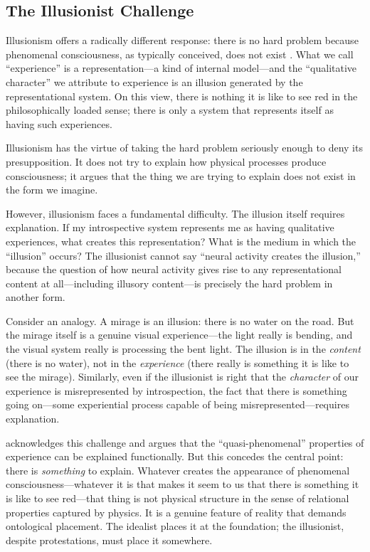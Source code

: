 \documentclass[11pt,a4paper]{article}
\theoremstyle{definition}
\theoremstyle{plain}
\theoremstyle{remark}
\begin{document}
\subsection{The Illusionist Challenge}\label{sec:illusionism}

Illusionism offers a radically different response: there is no hard problem because phenomenal consciousness, as typically conceived, does not exist \citep{Frankish2016}. What we call ``experience'' is a representation---a kind of internal model---and the ``qualitative character'' we attribute to experience is an illusion generated by the representational system. On this view, there is nothing it is like to see red in the philosophically loaded sense; there is only a system that represents itself as having such experiences.

Illusionism has the virtue of taking the hard problem seriously enough to deny its presupposition. It does not try to explain how physical processes produce consciousness; it argues that the thing we are trying to explain does not exist in the form we imagine.

However, illusionism faces a fundamental difficulty. The illusion itself requires explanation. If my introspective system represents me as having qualitative experiences, what creates this representation? What is the medium in which the ``illusion'' occurs? The illusionist cannot say ``neural activity creates the illusion,'' because the question of how neural activity gives rise to any representational content at all---including illusory content---is precisely the hard problem in another form.

Consider an analogy. A mirage is an illusion: there is no water on the road. But the mirage itself is a genuine visual experience---the light really is bending, and the visual system really is processing the bent light. The illusion is in the \textit{content} (there is no water), not in the \textit{experience} (there really is something it is like to see the mirage). Similarly, even if the illusionist is right that the \textit{character} of our experience is misrepresented by introspection, the fact that there is something going on---some experiential process capable of being misrepresented---requires explanation.

\citet{Frankish2016} acknowledges this challenge and argues that the ``quasi-phenomenal'' properties of experience can be explained functionally. But this concedes the central point: there is \textit{something} to explain. Whatever creates the appearance of phenomenal consciousness---whatever it is that makes it seem to us that there is something it is like to see red---that thing is not physical structure in the sense of relational properties captured by physics. It is a genuine feature of reality that demands ontological placement. The idealist places it at the foundation; the illusionist, despite protestations, must place it somewhere.
\end{document}
